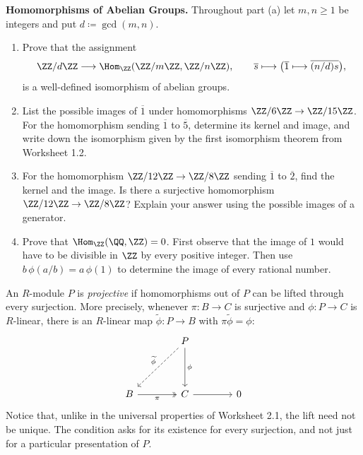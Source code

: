 \documentclass[12pt,reqno]{amsart}
\begin{document}
\hrulefill

\begin{problems}
\item\label{h:cyclic} \textbf{Homomorphisms of Abelian Groups.} Throughout part (a) let $m,n\geq1$ be integers and put $d\coloneqq\gcd(m,n)$.
\begin{enumerate}
\item Prove that the assignment
\[
\ZZ/d\ZZ\longrightarrow\Hom_{\ZZ}(\ZZ/m\ZZ,\ZZ/n\ZZ),\qquad\overline s\longmapsto\bigl(\overline1\longmapsto\overline{(n/d)s}\bigr),
\]
is a well-defined isomorphism of abelian groups.
\item List the possible images of $\overline1$ under homomorphisms $\ZZ/6\ZZ\to\ZZ/15\ZZ$. For the homomorphism sending $\overline1$ to $\overline5$, determine its kernel and image, and write down the isomorphism given by the first isomorphism theorem from Worksheet 1.2.
\item For the homomorphism $\ZZ/12\ZZ\to\ZZ/8\ZZ$ sending $\overline1$ to $\overline2$, find the kernel and the image. Is there a surjective homomorphism $\ZZ/12\ZZ\to\ZZ/8\ZZ$? Explain your answer using the possible images of a generator.
\item Prove that $\Hom_{\ZZ}(\QQ,\ZZ)=0$. First observe that the image of $1$ would have to be divisible in $\ZZ$ by every positive integer. Then use $b\,\phi(a/b)=a\,\phi(1)$ to determine the image of every rational number.
\end{enumerate}
\end{problems}

\hrulefill

An $R$-module $P$ is \emph{projective} if homomorphisms out of $P$ can be lifted through every surjection. More precisely, whenever $\pi:B\to C$ is surjective and $\phi:P\to C$ is $R$-linear, there is an $R$-linear map $\widetilde\phi:P\to B$ with $\pi\widetilde\phi=\phi$:
\[
\begin{tikzcd}[row sep=4em,column sep=4em]
& P\arrow[d,"\phi"]\arrow[dl,dashed,"\widetilde\phi"']&\\
B\arrow[r,two heads,"\pi"']&C\arrow[r]&0
\end{tikzcd}
\]
Notice that, unlike in the universal properties of Worksheet 2.1, the lift need not be unique. The condition asks for its existence for every surjection, and not just for a particular presentation of $P$.
\end{document}
